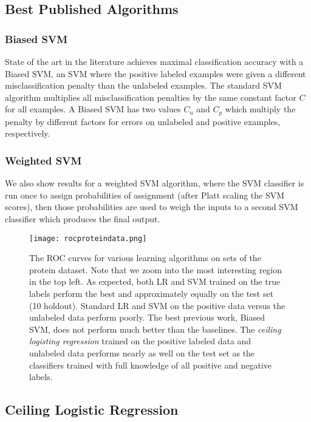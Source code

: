 \documentclass{article}
\begin{document}
\subsection{Best Published Algorithms}

\subsubsection{Biased SVM}

State of the art in the literature \cite{elkan08} achieves maximal classification accuracy with a Biased SVM, an SVM where the positive labeled examples were given a different misclassification penalty than the unlabeled examples.  The standard SVM algorithm multiplies all misclassification penalties by the same constant factor $C$ for all examples. A Biased SVM has two values $C_u$ and $C_p$ which multiply the penalty by different factors for errors on unlabeled and positive examples, respectively.

\subsubsection{Weighted SVM}

We also show results for a weighted SVM algorithm, where the SVM classifier is run once to assign probabilities of assignment (after Platt scaling the SVM scores), then those probabilities are used to weigh the inputs to a second SVM classifier which produces the final output.

\begin{figure*}[ht!]
\vskip 0.2in
\begin{center}
\centerline{\texttt{[image: rocproteindata.png]}}
\caption{The ROC curves for various learning algorithms on sets of the protein dataset.  Note that we zoom into the most interesting region in the top left.  As expected, both LR and SVM trained on the true labels perform the best and approximately equally on the test set (10 holdout). Standard LR and SVM on the positive data versus the unlabeled data perform poorly.  The best previous work, Biased SVM, does not perform much better than the baselines.  The \emph{ceiling logisting regression} trained on the positive labeled data and unlabeled data performs nearly as well on the test set as the classifiers trained with full knowledge of all positive and negative labels.}
\label{roc}
\end{center}
\vskip -0.2in
\end{figure*}
\subsection{Ceiling Logistic Regression}
\end{document}
